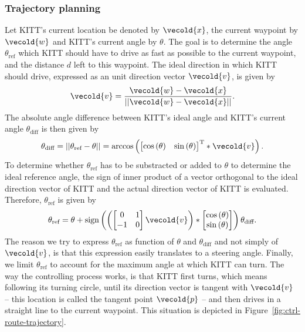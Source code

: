 \documentclass[11pt,titlepage]{report}
\let\vec\vecold
\newcommand{\vec}[1]{\mathbf{#1}}
\begin{document}
\subsubsection{Trajectory planning}
Let KITT's current location be denoted by $\vec{x}$, the current waypoint by $\vec{w}$ and KITT's current angle by $\theta$. The goal is to determine the angle $\theta_{\text{ref}}$ which KITT should have to drive as fast as possible to the current waypoint, and the distance $d$ left to this waypoint. The ideal direction in which KITT should drive, expressed as an unit direction vector $\vec{v}$, is given by
\[
	\vec{v} = \frac{\vec{w} - \vec{x}}{||\vec{w} - \vec{x}||}.
\]
The absolute angle difference between KITT's ideal angle and KITT's current angle $\theta_{\text{diff}}$ is then given by
\[
	\theta_{\text{diff}} = ||\theta_{\text{ref}} - \theta|| = \operatorname{arccos}\left( \tr{\begin{bmatrix}
		\cos{(\theta)} & \sin{(\theta)}
	\end{bmatrix}} \ast \vec{v} \right).
\]
To determine whether $\theta_{\text{ref}}$ has to be substracted or added to $\theta$ to determine the ideal reference angle, the sign of inner product of a vector orthogonal to the ideal direction vector of KITT and the actual direction vector of KITT is evaluated. Therefore, $\theta_{\text{ref}}$ is given by
\[
	\theta_{\text{ref}} = \theta + \operatorname{sign}\left(\left( \begin{bmatrix}
		0 & 1 \\
		-1 & 0
	\end{bmatrix} \vec{v} \right) \ast \begin{bmatrix}
		\cos{(\theta)} \\
		\sin{(\theta)}
	\end{bmatrix}\right) \theta_{\text{diff}}.
\]
The reason we try to express $\theta_{\text{ref}}$ as function of $\theta$ and $\theta_{\text{diff}}$ and not simply of $\vec{v}$, is that this expression easily translates to a steering angle. Finally, we limit $\theta_{\text{ref}}$ to account for the maximum angle at which KITT can turn. The way the controlling process works, is that KITT first turns, which means following its turning circle, until its direction vector is tangent with $\vec{v}$ -- this location is called the tangent point $\vec{p}$ -- and then drives in a straight line to the current waypoint. This situation is depicted in Figure~\ref{fig:ctrl-route-trajectory}.
\end{document}
